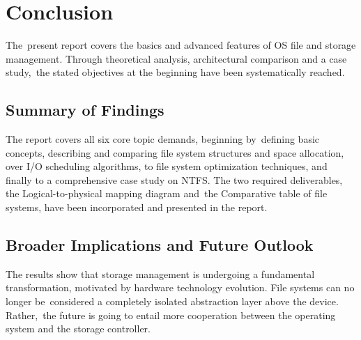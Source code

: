 \documentclass[12pt]{article}
\begin{document}
\section{Conclusion}
The present report covers the basics and advanced features of OS file and storage management. Through theoretical analysis, architectural comparison and a case study, the stated objectives at the beginning have been systematically reached. 

\subsection{Summary of Findings}
The report covers all six core topic demands, beginning by defining basic concepts, describing and comparing file system structures and space allocation, over I/O scheduling algorithms, to file system optimization techniques, and finally to a comprehensive case study on NTFS. The two required deliverables, the Logical-to-physical mapping diagram and the Comparative table of file systems, have been incorporated and presented in the report.

\subsection{Broader Implications and Future Outlook}
The results show that storage management is undergoing a fundamental transformation, motivated by hardware technology evolution. File systems can no longer be considered a completely isolated abstraction layer above the device. Rather, the future is going to entail more cooperation between the operating system and the storage controller.
\end{document}
